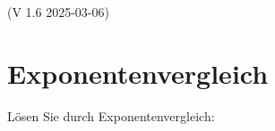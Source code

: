 

\renewcommand{\bbwAufgabenBlockID}{GL\_Ex}


\usepackage{amssymb} %

\renewcommand{\metaHeaderLine}{Arbeitsblatt}
\renewcommand{\arbeitsblattTitel}{Exponentialgleichungen}


\ifisNURAUFGABEN
\renewcommand{\abplz}[1]{\vspace{1mm}}
\fi


\newcommand{\seitenUmbruchImAufgabenteil}{
\ifisNURAUFGABEN
\else
\noTRAINER{\newpage}
\fi
}%



\arbeitsblattHeader{} (V 1.6 2025-03-06)

\section{Exponentenvergleich}


Lösen Sie durch Exponentenvergleich:


